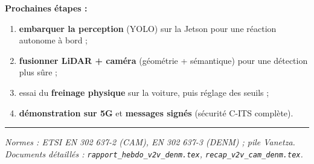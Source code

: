 \documentclass[a4paper,11pt]{article}
\newcommand{\code}[1]{\texttt{\small #1}}
\begin{document}
\textbf{Prochaines étapes :}
\begin{enumerate}[leftmargin=1.5em, itemsep=1pt]
  \item \textbf{embarquer la perception} (YOLO) sur la Jetson pour une réaction autonome à bord ;
  \item \textbf{fusionner LiDAR + caméra} (géométrie + sémantique) pour une détection plus sûre ;
  \item essai du \textbf{freinage physique} sur la voiture, puis réglage des seuils ;
  \item \textbf{démonstration sur 5G} et \textbf{messages signés} (sécurité C-ITS complète).
\end{enumerate}

\vspace{4pt}\hrule
{\footnotesize\itshape Normes : ETSI EN 302 637-2 (CAM), EN 302 637-3 (DENM) ; pile Vanetza.
Documents détaillés : \code{rapport\_hebdo\_v2v\_denm.tex}, \code{recap\_v2v\_cam\_denm.tex}.}
\end{document}
